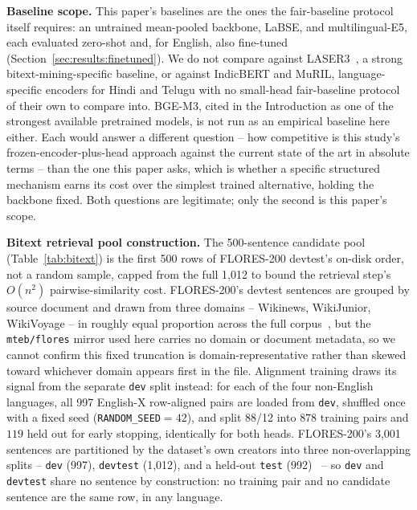 \documentclass[manuscript]{acmart}
\begin{document}
\textbf{Baseline scope.} This paper's baselines are the ones the fair-baseline protocol itself requires: an untrained mean-pooled backbone, LaBSE, and multilingual-E5, each evaluated zero-shot and, for English, also fine-tuned (Section~\ref{sec:results:finetuned}). We do not compare against LASER3~\citep{heffernan2022laser3}, a strong bitext-mining-specific baseline, or against IndicBERT and MuRIL, language-specific encoders for Hindi and Telugu with no small-head fair-baseline protocol of their own to compare into. BGE-M3, cited in the Introduction as one of the strongest available pretrained models, is not run as an empirical baseline here either. Each would answer a different question -- how competitive is this study's frozen-encoder-plus-head approach against the current state of the art in absolute terms -- than the one this paper asks, which is whether a specific structured mechanism earns its cost over the simplest trained alternative, holding the backbone fixed. Both questions are legitimate; only the second is this paper's scope.

\textbf{Bitext retrieval pool construction.} The 500-sentence candidate pool (Table~\ref{tab:bitext}) is the first 500 rows of FLORES-200 devtest's on-disk order, not a random sample, capped from the full 1,012 to bound the retrieval step's $O(n^2)$ pairwise-similarity cost. FLORES-200's devtest sentences are grouped by source document and drawn from three domains -- Wikinews, WikiJunior, WikiVoyage -- in roughly equal proportion across the full corpus~\citep{nllbteam2022flores200}, but the \texttt{mteb/flores} mirror used here carries no domain or document metadata, so we cannot confirm this fixed truncation is domain-representative rather than skewed toward whichever domain appears first in the file. Alignment training draws its signal from the separate \texttt{dev} split instead: for each of the four non-English languages, all 997 English-X row-aligned pairs are loaded from \texttt{dev}, shuffled once with a fixed seed (\texttt{RANDOM\_SEED}$=42$), and split 88/12 into $878$ training pairs and $119$ held out for early stopping, identically for both heads. FLORES-200's 3,001 sentences are partitioned by the dataset's own creators into three non-overlapping splits -- \texttt{dev} (997), \texttt{devtest} (1,012), and a held-out \texttt{test} (992)~\citep{nllbteam2022flores200} -- so \texttt{dev} and \texttt{devtest} share no sentence by construction: no training pair and no candidate sentence are the same row, in any language.
\end{document}
